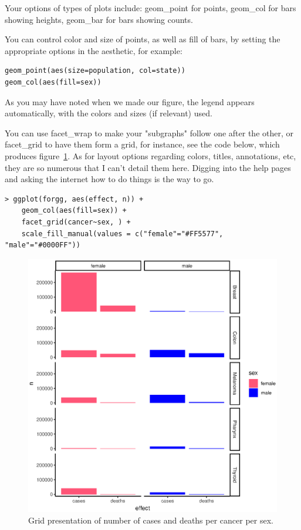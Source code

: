 \documentclass{report}
\newcommand{\code}[1]{\textsf{\ttfamily #1}}
\begin{document}
	Your options of types of plots include: \code{geom\_point} for points, \code{geom\_col} for bars showing heights, \code{geom\_bar} for bars showing counts.
	
	You can control color and size of points, as well as fill of bars, by setting the appropriate options in the aesthetic, for example:
	\begin{verbatim}
geom_point(aes(size=population, col=state))
geom_col(aes(fill=sex))
	\end{verbatim}
	As you may have noted when we made our figure, the legend appears automatically, with the colors and sizes (if relevant) used.
	
	You can use \code{facet\_wrap} to make your "subgraphs" follow one after the other, or \code{facet\_grid} to have them form a grid, for instance, see the code below, which produces figure~\ref{fig:facet_grid}. As for layout options regarding colors, titles, annotations, etc, they are so numerous that I can't detail them here. Digging into the help pages and asking the internet how to do things is the way to go.
	\begin{verbatim}
> ggplot(forgg, aes(effect, n)) +
	geom_col(aes(fill=sex)) +
	facet_grid(cancer~sex, ) +
	scale_fill_manual(values = c("female"="#FF5577", "male"="#0000FF"))
	\end{verbatim}
	\begin{figure}[h]
		\centering
		\includegraphics[width=1.0\textwidth]{facet_grid.eps}
		\caption{Grid presentation of number of cases and deaths per cancer per sex.}
		\label{fig:facet_grid}
	\end{figure}
\end{document}
